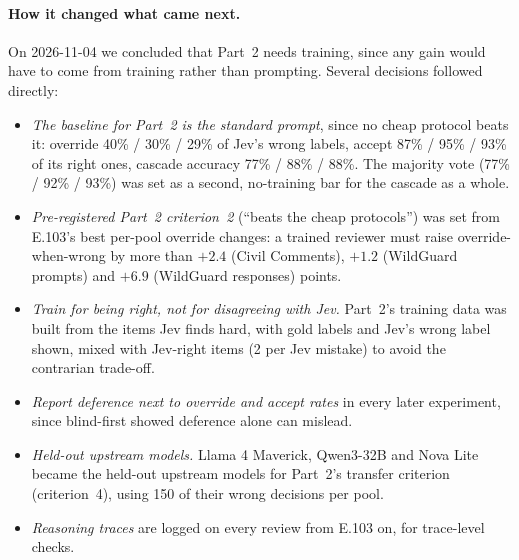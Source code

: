 \documentclass[11pt]{article}
\renewcommand{\_}{\origunderscore\allowbreak}
\begin{document}
\paragraph{How it changed what came next.}
On 2026-11-04 we concluded that Part~2 needs training, since any gain would have to come from training rather than prompting. Several decisions followed directly:
\begin{itemize}[nosep]
\item \emph{The baseline for Part~2 is the standard prompt}, since no cheap protocol beats it: override 40\% / 30\% / 29\% of Jev's wrong labels, accept 87\% / 95\% / 93\% of its right ones, cascade accuracy 77\% / 88\% / 88\%. The majority vote (77\% / 92\% / 93\%) was set as a second, no-training bar for the cascade as a whole.
\item \emph{Pre-registered Part~2 criterion~2} (``beats the cheap protocols'') was set from E.103's best per-pool override changes: a trained reviewer must raise override-when-wrong by more than $+2.4$ (Civil Comments), $+1.2$ (WildGuard prompts) and $+6.9$ (WildGuard responses) points.
\item \emph{Train for being right, not for disagreeing with Jev.} Part~2's training data was built from the items Jev finds hard, with gold labels and Jev's wrong label shown, mixed with Jev-right items (2 per Jev mistake) to avoid the contrarian trade-off.
\item \emph{Report deference next to override and accept rates} in every later experiment, since blind-first showed deference alone can mislead.
\item \emph{Held-out upstream models.} Llama 4 Maverick, Qwen3-32B and Nova Lite became the held-out upstream models for Part~2's transfer criterion (criterion~4), using 150 of their wrong decisions per pool.
\item \emph{Reasoning traces} are logged on every review from E.103 on, for trace-level checks.
\end{itemize}
\end{document}
